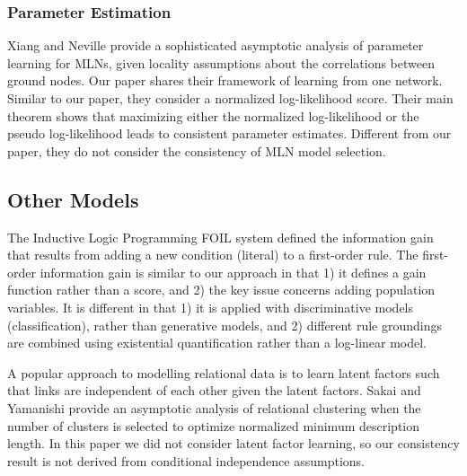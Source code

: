 \documentclass[letterpaper]{article}
\begin{document}
\subsubsection{Parameter Estimation} Xiang and Neville \cite{Xiang2011} provide a sophisticated asymptotic analysis of parameter learning for MLNs, given locality assumptions about the correlations between ground nodes. Our paper shares their framework of learning from one network. Similar to our paper, they consider a normalized log-likelihood score. Their main theorem shows that maximizing either the normalized log-likelihood or the pseudo log-likelihood leads to consistent parameter estimates. Different from our paper, they do not consider the consistency of MLN model selection.



\subsection{Other Models} 
The Inductive Logic Programming FOIL system \cite{foil} defined the information gain that results from adding a new condition (literal) to a first-order rule. The first-order information gain is similar to our approach in that 1) it defines a gain function rather than a score, and 2) the key issue concerns adding population variables. It is different in that 1) it is applied with discriminative models (classification), rather than generative models, and 2) different rule groundings are combined using existential quantification rather than a log-linear model.

A popular approach to modelling relational data is to learn latent factors such that links are independent of each other given the latent factors. 
%
Sakai and Yamanishi 
\cite{Sakai2013} provide an asymptotic analysis of relational clustering when the number of clusters is selected to optimize normalized minimum description length. In this paper we did not consider latent factor learning, so our consistency result is not derived from conditional independence assumptions.
\end{document}
